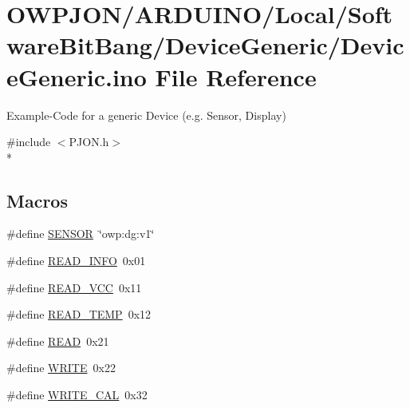 \hypertarget{ARDUINO_2Local_2SoftwareBitBang_2DeviceGeneric_2DeviceGeneric_8ino}{\section{O\-W\-P\-J\-O\-N/\-A\-R\-D\-U\-I\-N\-O/\-Local/\-Software\-Bit\-Bang/\-Device\-Generic/\-Device\-Generic.ino File Reference}
\label{ARDUINO_2Local_2SoftwareBitBang_2DeviceGeneric_2DeviceGeneric_8ino}
}


Example-\/\-Code for a generic Device (e.\-g. Sensor, Display)  


{\ttfamily \#include $<$P\-J\-O\-N.\-h$>$}\\*
\subsection*{Macros}
\begin{DoxyCompactItemize}
\item 
\#define \hyperlink{ARDUINO_2Local_2SoftwareBitBang_2DeviceGeneric_2DeviceGeneric_8ino_a84f1ead330bbcc83a63929c4726080d7}{S\-E\-N\-S\-O\-R}~\char`\"{}owp\-:dg\-:v1\char`\"{}
\item 
\#define \hyperlink{ARDUINO_2Local_2SoftwareBitBang_2DeviceGeneric_2DeviceGeneric_8ino_ae9d85efda88bdfdba5ca9fe92f557dd9}{R\-E\-A\-D\-\_\-\-I\-N\-F\-O}~0x01
\item 
\#define \hyperlink{ARDUINO_2Local_2SoftwareBitBang_2DeviceGeneric_2DeviceGeneric_8ino_a3563b296d5f60635a1256e8a12261d74}{R\-E\-A\-D\-\_\-\-V\-C\-C}~0x11
\item 
\#define \hyperlink{ARDUINO_2Local_2SoftwareBitBang_2DeviceGeneric_2DeviceGeneric_8ino_ac8c23082885adeec4834469b64e00bb9}{R\-E\-A\-D\-\_\-\-T\-E\-M\-P}~0x12
\item 
\#define \hyperlink{ARDUINO_2Local_2SoftwareBitBang_2DeviceGeneric_2DeviceGeneric_8ino_ada74e7db007a68e763f20c17f2985356}{R\-E\-A\-D}~0x21
\item 
\#define \hyperlink{ARDUINO_2Local_2SoftwareBitBang_2DeviceGeneric_2DeviceGeneric_8ino_aa10f470e996d0f51210d24f442d25e1e}{W\-R\-I\-T\-E}~0x22
\item 
\#define \hyperlink{ARDUINO_2Local_2SoftwareBitBang_2DeviceGeneric_2DeviceGeneric_8ino_a9418b096dba157494f523dc01b82a760}{W\-R\-I\-T\-E\-\_\-\-C\-A\-L}~0x32
\end{DoxyCompactItemize}
